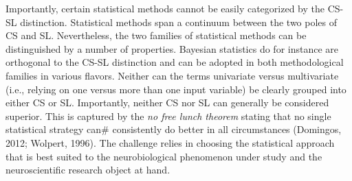 \documentclass[authoryear,review,3p]{elsarticle}
\begin{document}
Importantly, certain statistical
methods cannot be easily categorized by the CS-SL distinction.
Statistical methods span a continuum between the two poles of CS and SL.
Nevertheless, the two families of statistical methods can be distinguished by a number of properties.
Bayesian statistics do for instance are orthogonal to the CS-SL distinction
and can be adopted in both methodological families in various flavors.
Neither can the terms univariate versus multivariate
(i.e., relying on one versus more than one input variable)
be clearly grouped into either CS or SL.
%
Importantly, neither CS nor SL can generally be considered superior.
This is captured by the \textit{no free lunch theorem}
stating that no single statistical strategy can#
consistently do better in all circumstances (Domingos, 2012; Wolpert, 1996).
The challenge relies in choosing
the statistical approach that is best suited to the neurobiological phenomenon under study and the neuroscientific research object at hand.
\end{document}
